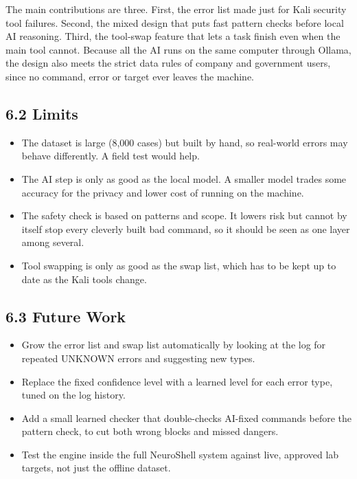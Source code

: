\documentclass[
]{article}
\begin{document}
The main contributions are three. First, the error list made just for
Kali security tool failures. Second, the mixed design that puts fast
pattern checks before local AI reasoning. Third, the tool-swap feature
that lets a task finish even when the main tool cannot. Because all the
AI runs on the same computer through Ollama, the design also meets the
strict data rules of company and government users, since no command,
error or target ever leaves the machine.

\hypertarget{limits}{%
\subsection{6.2 Limits}\label{limits}}

\begin{itemize}
\item
  The dataset is large (8,000 cases) but built by hand, so real-world
  errors may behave differently. A field test would help.
\item
  The AI step is only as good as the local model. A smaller model trades
  some accuracy for the privacy and lower cost of running on the
  machine.
\item
  The safety check is based on patterns and scope. It lowers risk but
  cannot by itself stop every cleverly built bad command, so it should
  be seen as one layer among several.
\item
  Tool swapping is only as good as the swap list, which has to be kept
  up to date as the Kali tools change.
\end{itemize}

\hypertarget{future-work}{%
\subsection{6.3 Future Work}\label{future-work}}

\begin{itemize}
\item
  Grow the error list and swap list automatically by looking at the log
  for repeated UNKNOWN errors and suggesting new types.
\item
  Replace the fixed confidence level with a learned level for each error
  type, tuned on the log history.
\item
  Add a small learned checker that double-checks AI-fixed commands
  before the pattern check, to cut both wrong blocks and missed dangers.
\item
  Test the engine inside the full NeuroShell system against live,
  approved lab targets, not just the offline dataset.
\end{itemize}
\end{document}
